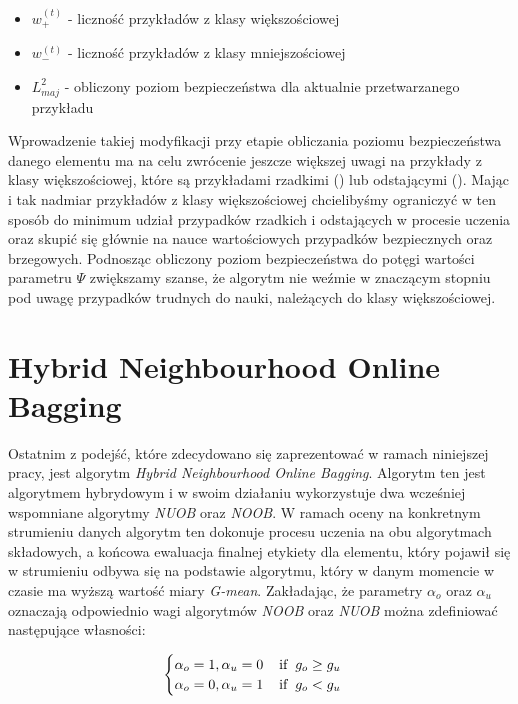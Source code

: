 \begin{itemize}
    \item $w^{(t)}_{+}$ - liczność przykładów z klasy większościowej
    \item $w^{(t)}_{-}$ - liczność przykładów z klasy mniejszościowej
    \item $L^2_{maj}$ - obliczony poziom bezpieczeństwa dla aktualnie przetwarzanego przykładu
\end{itemize}

\noindent Wprowadzenie takiej modyfikacji przy etapie obliczania poziomu bezpieczeństwa danego elementu ma na celu zwrócenie jeszcze większej uwagi na przykłady z klasy większościowej, które są przykładami rzadkimi () lub odstającymi (). Mając i tak nadmiar przykładów z klasy większościowej chcielibyśmy ograniczyć w ten sposób do minimum udział przypadków rzadkich i odstających w procesie uczenia oraz skupić się głównie na nauce wartościowych przypadków bezpiecznych oraz brzegowych. Podnosząc obliczony poziom bezpieczeństwa do potęgi wartości parametru $\Psi$ zwiększamy szanse, że algorytm nie weźmie w znaczącym stopniu pod uwagę przypadków trudnych do nauki, należących do klasy większościowej.

\newpage

\section{Hybrid Neighbourhood Online Bagging}

\noindent Ostatnim z podejść, które zdecydowano się zaprezentować w ramach niniejszej pracy, jest algorytm \textit{Hybrid Neighbourhood Online Bagging}. Algorytm ten jest algorytmem hybrydowym i w swoim działaniu wykorzystuje dwa wcześniej wspomniane algorytmy \textit{NUOB} oraz \textit{NOOB}. W ramach oceny na konkretnym strumieniu danych algorytm ten dokonuje procesu uczenia na obu algorytmach składowych, a końcowa ewaluacja finalnej etykiety dla elementu, który pojawił się w strumieniu odbywa się na podstawie algorytmu, który w danym momencie w czasie ma wyższą wartość miary \textit{G-mean}. Zakładając, że parametry $\alpha_o$ oraz $\alpha_u$ oznaczają odpowiednio wagi algorytmów \textit{NOOB} oraz \textit{NUOB} można zdefiniować następujące własności:

\begin{equation}
    \begin{cases}
    \alpha_o = 1, \alpha_u = 0 \hspace{4mm} \textrm{if} \hspace{2mm} g_o \geq g_u\\
    \alpha_o = 0, \alpha_u = 1 \hspace{4mm} \textrm{if} \hspace{2mm} g_o < g_u
    \end{cases}
\end{equation}

